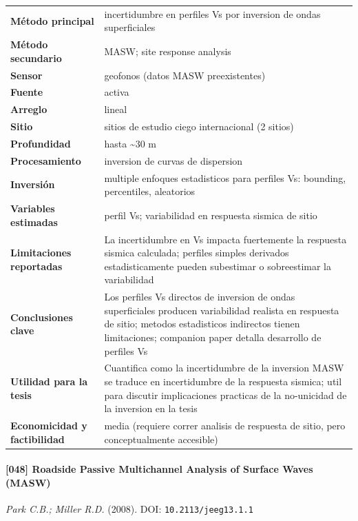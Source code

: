 \begin{center}\scriptsize
\begin{tabularx}{\textwidth}{@{}>{\bfseries}p{3.3cm} X@{}}
\toprule
M\'etodo principal & incertidumbre en perfiles Vs por inversion de ondas superficiales \\
M\'etodo secundario & MASW; site response analysis \\
Sensor & geofonos (datos MASW preexistentes) \\
Fuente & activa \\
Arreglo & lineal \\
Sitio & sitios de estudio ciego internacional (2 sitios) \\
Profundidad & hasta \textasciitilde{}30 m \\
Procesamiento & inversion de curvas de dispersion \\
Inversi\'on & multiple enfoques estadisticos para perfiles Vs: bounding, percentiles, aleatorios \\
Variables estimadas & perfil Vs; variabilidad en respuesta sismica de sitio \\
Limitaciones reportadas & La incertidumbre en Vs impacta fuertemente la respuesta sismica calculada; perfiles simples derivados estadisticamente pueden subestimar o sobreestimar la variabilidad \\
Conclusiones clave & Los perfiles Vs directos de inversion de ondas superficiales producen variabilidad realista en respuesta de sitio; metodos estadisticos indirectos tienen limitaciones; companion paper detalla desarrollo de perfiles Vs \\
Utilidad para la tesis & Cuantifica como la incertidumbre de la inversion MASW se traduce en incertidumbre de la respuesta sismica; util para discutir implicaciones practicas de la no-unicidad de la inversion en la tesis \\
Economicidad y factibilidad & media (requiere correr analisis de respuesta de sitio, pero conceptualmente accesible) \\
\bottomrule
\end{tabularx}
\end{center}

\paragraph{[048] Roadside Passive Multichannel Analysis of Surface Waves (MASW)} \emph{Park C.B.; Miller R.D.} (2008).
{\scriptsize DOI: \texttt{10.2113/jeeg13.1.1}}

